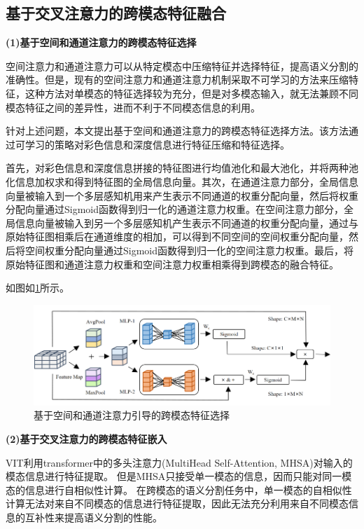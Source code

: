 \subsection{基于交叉注意力的跨模态特征融合}
\textbf{(1)基于空间和通道注意力的跨模态特征选择}

空间注意力和通道注意力可以从特定模态中压缩特征并选择特征，提高语义分割的准确性。但是，现有的空间注意力和通道注意力机制采取不可学习的方法来压缩特征，这种方法对单模态的特征选择较为充分，但是对多模态输入，就无法兼顾不同模态特征之间的差异性，进而不利于不同模态信息的利用。

针对上述问题，本文提出基于空间和通道注意力的跨模态特征选择方法。该方法通过可学习的策略对彩色信息和深度信息进行特征压缩和特征选择。

首先，对彩色信息和深度信息拼接的特征图进行均值池化和最大池化，并将两种池化信息加权求和得到特征图的全局信息向量。其次，在通道注意力部分，全局信息向量被输入到一个多层感知机用来产生表示不同通道的权重分配向量，然后将权重分配向量通过Sigmoid函数得到归一化的通道注意力权重。在空间注意力部分，全局信息向量被输入到另一个多层感知机产生表示不同通道的权重分配向量，通过与原始特征图相乘后在通道维度的相加，可以得到不同空间的空间权重分配向量，然后将空间权重分配向量通过Sigmoid函数得到归一化的空间注意力权重。最后，将原始特征图和通道注意力权重和空间注意力权重相乘得到跨模态的融合特征。

如图如\ref{图：特征选择}所示。
\begin{figure}[h]
	\centering
	\includegraphics[width=\textwidth]{figures/特征选择.png}
	\caption{基于空间和通道注意力引导的跨模态特征选择}
	\label{图：特征选择}
\end{figure}


\textbf{(2)基于交叉注意力的跨模态特征嵌入}

VIT利用transformer中的多头注意力(MultiHead Self-Attention, MHSA)对输入的模态信息进行特征提取。
但是MHSA只接受单一模态的信息，因而只能对同一模态的信息进行自相似性计算。
在跨模态的语义分割任务中，单一模态的自相似性计算无法对来自不同模态的信息进行特征提取，因此无法充分利用来自不同模态信息的互补性来提高语义分割的性能。


